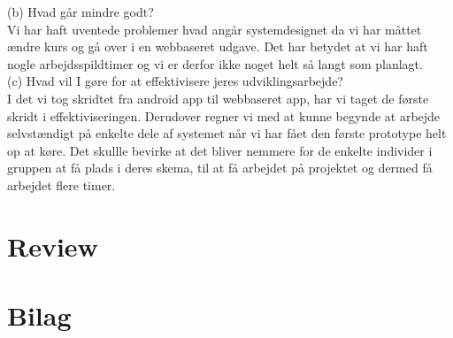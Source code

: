 \documentclass[12pt]{article}
\begin{document}
(b) Hvad går mindre godt?\\

Vi har haft uventede problemer hvad angår systemdesignet da vi har måttet ændre kurs og gå over i en webbaseret udgave. Det har betydet at vi har haft nogle arbejdsspildtimer og vi er derfor ikke noget helt så langt som planlagt.\\

(c) Hvad vil I gøre for at effektivisere jeres udviklingsarbejde?\\

I det vi tog skridtet fra android app til webbaseret app, har vi taget de første skridt i effektiviseringen. Derudover regner vi med at kunne begynde at arbejde selvstændigt på enkelte dele af systemet når vi har fået den første prototype helt op at køre. Det skullle bevirke at det bliver nemmere for de enkelte individer i gruppen at få plads i deres skema, til at få arbejdet på projektet og dermed få arbejdet flere timer. 

\pagebreak
\section{Review}

\section{Bilag}
\end{document}
